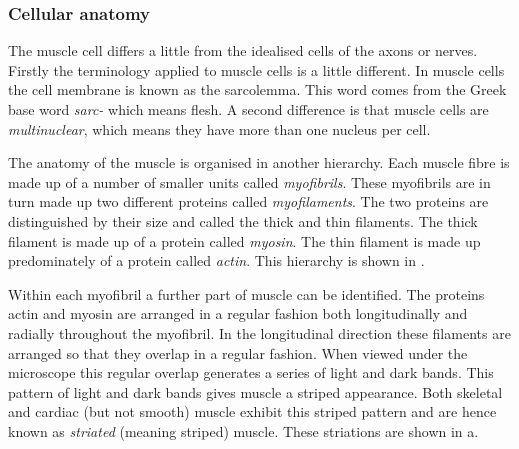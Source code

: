 
\subsubsection{Cellular anatomy}
The muscle cell differs a little from the idealised cells of the axons or
nerves. Firstly the terminology applied to muscle cells is a little different.
In muscle cells the cell membrane is known as the sarcolemma. This word
comes from the Greek base word \emph{sarc-} which means flesh. A second
difference is that muscle cells are \emph{multinuclear}, which means they have
more than one nucleus per cell.

\enlargethispage{-\baselineskip}
\enlargethispage{-\baselineskip}
\enlargethispage{-\baselineskip}
\enlargethispage{-\baselineskip}
The anatomy of the muscle is organised in another hierarchy. Each muscle
fibre is made up of a number of smaller units called \emph{myofibrils}. These
myofibrils are in turn made up two different proteins called
\emph{myofilaments}. The two proteins are distinguished by their size and
called the thick and thin filaments. The thick filament is made up of a
protein called \emph{myosin}. The thin filament is made up predominately of a
protein called \emph{actin}. This hierarchy is shown in
\nocite{marieb:1992}.


Within each myofibril a further part of muscle can be identified. The proteins
actin and myosin are arranged in a regular fashion both longitudinally and
radially throughout the myofibril. In the longitudinal direction these
filaments are arranged so that they overlap in a regular fashion. When viewed
under the microscope this regular overlap generates a series of light and dark
bands. This pattern of light and dark bands gives muscle a striped appearance.
Both skeletal and cardiac (but not smooth) muscle exhibit this striped pattern
and are hence known as \emph{striated} (meaning striped) muscle. These
striations are shown in a.


